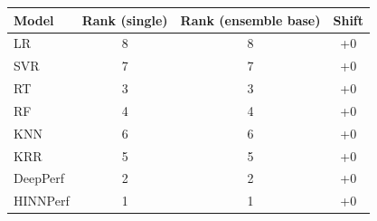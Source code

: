 \begin{tabular}{lccc}
\toprule
Model & Rank (single) & Rank (ensemble base) & Shift \\
\midrule
LR & 8 & 8 & +0 \\
SVR & 7 & 7 & +0 \\
RT & 3 & 3 & +0 \\
RF & 4 & 4 & +0 \\
KNN & 6 & 6 & +0 \\
KRR & 5 & 5 & +0 \\
DeepPerf & 2 & 2 & +0 \\
HINNPerf & 1 & 1 & +0 \\
\bottomrule
\end{tabular}
